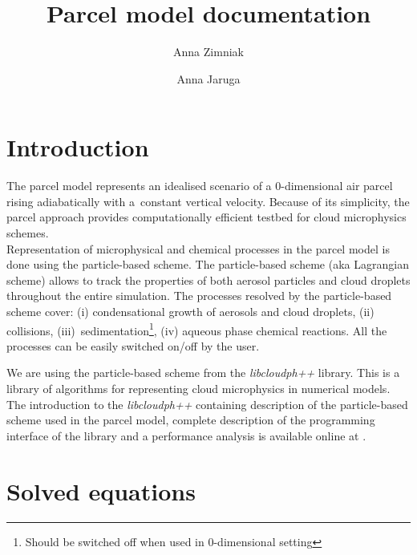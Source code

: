 \documentclass[11pt]{article}
\author{Anna Zimniak}
\author{Anna Jaruga}
\affil{Institute of Geophysics, Faculty of Physics, University of Warsaw, Poland}
\title{Parcel model documentation}
\begin{document}
\maketitle
\vspace{-4em}


\section{Introduction}\label{sec:intro}

The parcel model represents an idealised scenario of a 0-dimensional air parcel rising adiabatically with a~constant vertical velocity. 
Because of its simplicity, the parcel approach provides computationally efficient testbed for cloud microphysics schemes.\\

Representation of microphysical and chemical processes in the parcel model is done using the particle-based scheme.
The particle-based scheme (aka Lagrangian scheme) allows to track the properties of both 
  aerosol particles and cloud droplets throughout the entire simulation.
The processes resolved by the particle-based scheme cover:
  (i) condensational growth of aerosols and cloud droplets,
  (ii) collisions,
  (iii)~sedimentation\footnote{Should be switched off when used in 0-dimensional setting},
  (iv) aqueous phase chemical reactions.
All the processes can be easily switched on/off by the user.

We are using the particle-based scheme from the \emph{libcloudph++} library. This is a library of algorithms for representing cloud microphysics in numerical models.
The introduction to the \emph{libcloudph++} containing description of the particle-based scheme used in the parcel model, 
  complete description of the programming interface of the library and a performance analysis
  is available online at \cite{Arabas_et_al_2015}.\\

\section{Solved equations}\label{sec:eqs}
\end{document}
